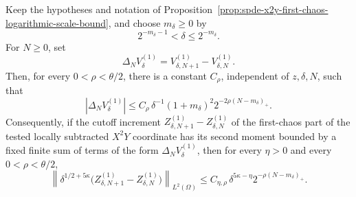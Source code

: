 \begin{proposition}
\label{prop:spde-x2y-first-chaos-cutoff-shell-gain}
Keep the hypotheses and notation of
Proposition~\ref{prop:spde-x2y-first-chaos-logarithmic-scale-bound}, and
choose \(m_\delta\geq0\) by
\[
  2^{-m_\delta-1}<\delta\leq2^{-m_\delta}.
\]
For \(N\geq0\), set
\[
  \Delta_N V_\delta^{(1)}
  =
  V_{\delta,N+1}^{(1)}-V_{\delta,N}^{(1)} .
\]
Then, for every \(0<\rho<\theta/2\), there is a constant \(C_\rho\),
independent of \(z,\delta,N\), such that
\begin{equation}
  |\Delta_N V_\delta^{(1)}|
  \leq
  C_\rho\,\delta^{-1}
  (1+m_\delta)^2
  2^{-2\rho(N-m_\delta)_+}.
  \label{eq:spde-first-chaos-cutoff-shell-variance-gain}
\end{equation}
Consequently, if the cutoff increment
\(Z_{\delta,N+1}^{(1)}-Z_{\delta,N}^{(1)}\) of the first-chaos part of the
tested locally subtracted \(X^2Y\) coordinate has its second moment bounded
by a fixed finite sum of terms of the form
\(\Delta_N V_\delta^{(1)}\), then for every \(\eta>0\) and
every \(0<\rho<\theta/2\),
\begin{equation}
  \left\|
    \delta^{1/2+5\kappa}
    \bigl(Z_{\delta,N+1}^{(1)}-Z_{\delta,N}^{(1)}\bigr)
  \right\|_{L^2(\Omega)}
  \leq
  C_{\eta,\rho}\,
  \delta^{5\kappa-\eta}
  2^{-\rho(N-m_\delta)_+}.
  \label{eq:spde-first-chaos-cutoff-shell-normalized}
\end{equation}
\end{proposition}

